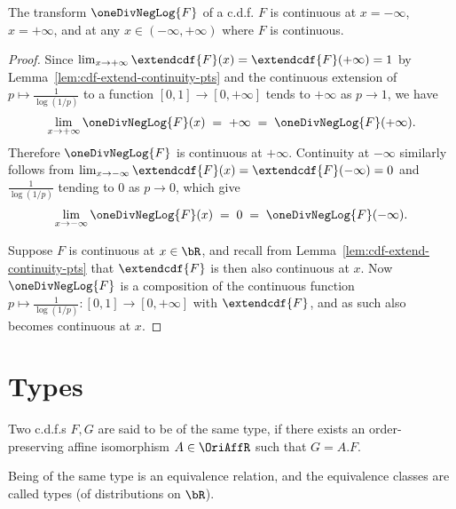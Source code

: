 \begin{lemma}
  \label{lem:one-div-neg-log-cdf-continuity-pts}
  \leanok
  The transform $\oneDivNegLog{F}$ of a c.d.f. $F$ is continuous
  at $x = -\infty$, $x = + \infty$, and at any
  $x \in (-\infty,+\infty)$ where $F$ is continuous.
\end{lemma}
\begin{proof}
  Since $\lim_{x \to +\infty} \extendcdf{F}(x) = \extendcdf{F}(+\infty) = 1$
  by Lemma~\ref{lem:cdf-extend-continuity-pts} and the continuous extension
  of $p \mapsto \frac{1}{\log(1/p)}$ to a function $[0,1] \to [0,+\infty]$
  tends to $+\infty$ as $p \to 1$, we have
  \begin{align*}
    \lim_{x \to +\infty} \oneDivNegLog{F}(x)
    \; = \; +\infty \; = \; \oneDivNegLog{F}(+\infty) .
  \end{align*}
  Therefore $\oneDivNegLog{F}$ is continuous at $+\infty$.
  Continuity at $-\infty$ similarly follows from
  $\lim_{x \to -\infty} \extendcdf{F}(x) = \extendcdf{F}(-\infty) = 0$
  and $\frac{1}{\log(1/p)}$ tending to $0$
  as $p \to 0$, which give
  \begin{align*}
    \lim_{x \to -\infty} \oneDivNegLog{F}(x)
    \; = \; 0 \; = \; \oneDivNegLog{F}(-\infty) .
  \end{align*}

  Suppose $F$ is continuous at $x \in \bR$,
  and recall from Lemma~\ref{lem:cdf-extend-continuity-pts} that
  $\extendcdf{F}$ is then also continuous at $x$.
  Now $\oneDivNegLog{F}$ is a composition of the continuous function
  $p \mapsto \frac{1}{\log(1/p)} \colon [0,1] \to [0,+\infty]$ with
  $\extendcdf{F}$, and as such also becomes continuous at $x$.
\end{proof}


\chapter{Types}

\begin{definition}
  \label{def:cdf-type}
  Two c.d.f.s $F, G$ are said to be of the same type, if
  there exists an order-preserving affine isomorphism $A \in \OriAffR$
  such that $G = A . F$.

  Being of the same type is an equivalence relation, and
  the equivalence classes are called types (of distributions on $\bR$).
\end{definition}


